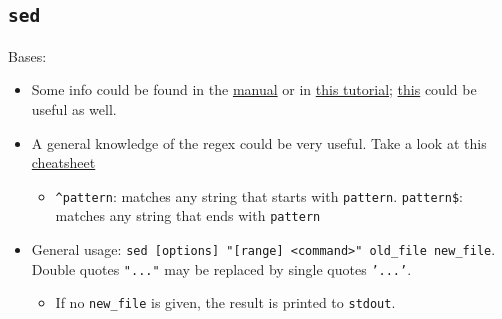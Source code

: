 \documentclass[a4paper,12pt,%
              final%
              ]{article}
\begin{document}
\subsection{\texttt{sed}}
Bases:
\begin{itemize}
  \item Some info could be found in the \href{https://www.gnu.org/software/sed/manual/sed.html}{manual} or in \href{http://www.grymoire.com/Unix/Sed.html}{this tutorial}; \href{https://www.tutorialspoint.com/unix/unix-regular-expressions.htm}{this} could be useful as well.
  \item A general knowledge of the regex could be very useful. Take a look at this \href{https://medium.com/factory-mind/regex-tutorial-a-simple-cheatsheet-by-examples-649dc1c3f285}{cheatsheet}
    \begin{itemize}
      \item \verb|^pattern|: matches any string that starts with \texttt{pattern}. \verb|pattern$|: matches any string that ends with \texttt{pattern}
    \end{itemize}
  \item General usage: \verb|sed [options] "[range] <command>" old_file new_file|. Double quotes \texttt{"..."} may be replaced by single quotes \texttt{'...'}.
    \begin{itemize}
      \item If no \verb|new_file| is given, the result is printed to \texttt{stdout}.
    \end{itemize}
\end{itemize}
\end{document}
